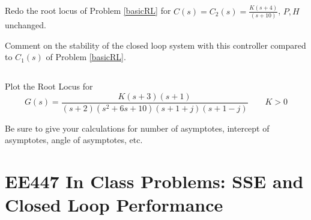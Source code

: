 \documentclass{article}	%
\begin{document}

\subsection{}
Redo the root locus of Problem \ref{basicRL} for $C(s) = C_2(s) = \frac{K(s+4)}{(s+10)}$, $P, H$ unchanged.

Comment on the stability of the closed loop system with this controller compared to $C_1(s)$ of Problem \ref{basicRL}.


%
%
%
%






\subsection{}
Plot the Root Locus for
\[
G(s) = \frac {K(s+3)(s+1)}
{(s+2)(s^2+6s+10)(s+1+j)(s+1-j)}  \qquad  K>0
\]



Be sure to give your calculations for number of asymptotes, intercept of asymptotes, angle of asymptotes, etc.

%
%
%
%
%
%
%
%






\newpage
\section{EE447 In Class Problems: SSE and Closed Loop Performance}
\end{document}
